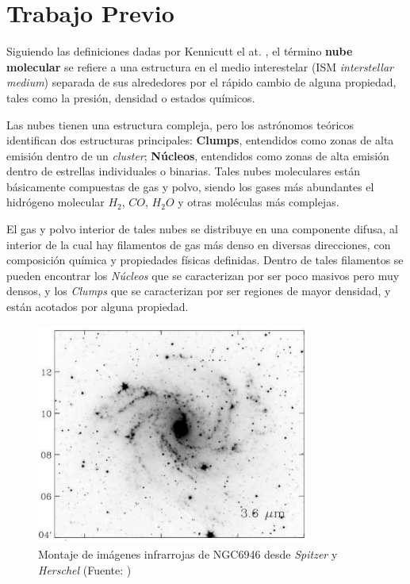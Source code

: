 \chapter{Trabajo Previo}

Siguiendo las definiciones dadas por Kennicutt el at. \cite{Kennicutt}, el término \textbf{nube molecular} se refiere a una estructura en el medio interestelar (ISM \textit{interstellar medium}) separada de sus alrededores por el rápido cambio de alguna propiedad, tales como la presión, densidad o estados químicos.

Las nubes tienen una estructura compleja, pero los astrónomos teóricos identifican dos estructuras principales: \textbf{Clumps}, entendidos como zonas de alta emisión dentro de un \textit{cluster}; \textbf{Núcleos}, entendidos como zonas de alta emisión dentro de estrellas individuales o binarias. Tales nubes moleculares están básicamente compuestas de gas y polvo, siendo los gases más abundantes el hidrógeno molecular $H_2$, $CO$, $H_2O$ y otras moléculas más complejas.

El gas y polvo interior de tales nubes se distribuye en una componente difusa, al interior de la cual hay filamentos de gas más denso en diversas direcciones, con composición química y propiedades físicas definidas. Dentro de tales filamentos se pueden encontrar los \textit{Núcleos} que se caracterizan por ser poco masivos pero muy densos, y los \textit{Clumps} que se caracterizan por ser regiones de mayor densidad, y están acotados por alguna propiedad.

\begin{figure}[htpb!]
\centering
\includegraphics[width=9cm]{ngc}
\caption{Montaje de imágenes infrarrojas de NGC6946 desde \textit{Spitzer} y \textit{Herschel} (Fuente: \cite{Williams})}
\label{fig:cf}
\end{figure}

